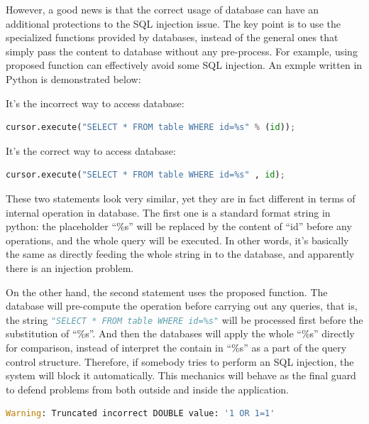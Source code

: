 \documentclass[conference]{IEEEtran}
\begin{document}
However, a good news is that the correct usage of database can have an
additional protections to the SQL injection issue.
The key point is to use the specialized functions provided by databases,
instead of the general ones that simply pass the content to database
without any pre-process.
For example, using proposed function can effectively
avoid some SQL injection. An exmple written in Python is demonstrated below:

It's the incorrect way to access database:
\begin{lstlisting}[language=python]
cursor.execute("SELECT * FROM table WHERE id=%s" % (id));
\end{lstlisting}

It's the correct way to access database:
\begin{lstlisting}[language=python]
cursor.execute("SELECT * FROM table WHERE id=%s" , id);
\end{lstlisting}

These two statements look very similar, yet they are
in fact different in terms of internal operation in database.
The first one is a standard format string in python:
the placeholder ``\%s'' will be replaced by the content
of ``id'' before any operations,
and the whole query will be executed.
In other words, it's basically the same as directly
feeding the whole string in to the database,
and
apparently there is an injection problem.

On the other hand,
the second statement uses the proposed function.
The database will pre-compute the operation before carrying out any queries,
that is, the string \lstinline[language=python]{"SELECT * FROM table WHERE id=%s"}
will be processed first before the substitution of ``\%s''.
And then the databases will apply the whole ``\%s'' directly for comparison,
instead of interpret the contain in ``\%s'' as a part of the
query control structure.
Therefore,
if somebody tries to perform an SQL injection, the system will block it automatically.
This mechanics will behave as the final guard to defend problems
from both outside and inside
the application.
\begin{lstlisting}[language=python]
Warning: Truncated incorrect DOUBLE value: '1 OR 1=1'
\end{lstlisting}
\end{document}

